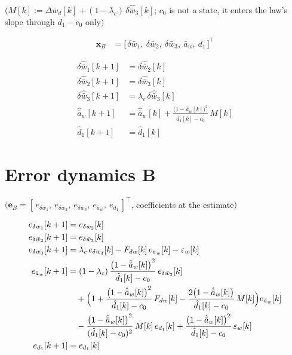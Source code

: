 \documentclass[11pt,a4paper,fontset=none]{ctexart}
\newcommand{\ba}{\bar{a}}
\newcommand{\bw}{\bar{w}}
\newcommand{\ah}{\hat{\ba}_w}
\newcommand{\dhat}{\hat{d}_1}
\begin{document}
$\bigl(M[k] := \Delta\bw_d[k] + (1-\lambda_c)\,\delta\hat{\bw}_3[k]$; $c_0$ is not a state, it enters the law's slope through $d_1 - c_0$ only$\bigr)$

\begin{align*}
\mathbf{x}_B &= \bigl[\,\delta\bw_1,\ \delta\bw_2,\ \delta\bw_3,\ \ba_w,\ d_1\,\bigr]^{\top}
\end{align*}

\begin{align*}
\delta\hat{\bw}_1[k+1] &= \delta\hat{\bw}_2[k] \\
\delta\hat{\bw}_2[k+1] &= \delta\hat{\bw}_3[k] \\
\delta\hat{\bw}_3[k+1] &= \lambda_c\,\delta\hat{\bw}_3[k] \\
\ah[k+1]               &= \ah[k] + \frac{\bigl(1-\ah[k]\bigr)^{2}}{\dhat[k] - c_0}\,M[k] \\
\dhat[k+1]               &= \dhat[k]
\end{align*}

\section{Error dynamics B}

$\bigl(\mathbf{e}_B = [\,e_{\delta\bw_1},\ e_{\delta\bw_2},\ e_{\delta\bw_3},\ e_{\ba_w},\ e_{d_1}\,]^{\top}$, coefficients at the estimate$\bigr)$

\begin{align*}
e_{\delta\bw_1}[k+1] &= e_{\delta\bw_2}[k] \\
e_{\delta\bw_2}[k+1] &= e_{\delta\bw_3}[k] \\
e_{\delta\bw_3}[k+1] &= \lambda_c\,e_{\delta\bw_3}[k] - F_{dw}[k]\,e_{\ba_w}[k] - \varepsilon_w[k] \\
e_{\ba_w}[k+1]       &= (1-\lambda_c)\,\frac{\bigl(1-\ah[k]\bigr)^{2}}{\dhat[k] - c_0}\,e_{\delta\bw_3}[k] \\
                     &\quad + \Bigl(1 + \frac{\bigl(1-\ah[k]\bigr)^{2}}{\dhat[k] - c_0}\,F_{dw}[k] - \frac{2\bigl(1-\ah[k]\bigr)}{\dhat[k] - c_0}\,M[k]\Bigr)e_{\ba_w}[k] \\
                     &\quad - \frac{\bigl(1-\ah[k]\bigr)^{2}}{(\dhat[k] - c_0)^{2}}\,M[k]\,e_{d_1}[k]
                        + \frac{\bigl(1-\ah[k]\bigr)^{2}}{\dhat[k] - c_0}\,\varepsilon_w[k] \\
e_{d_1}[k+1]         &= e_{d_1}[k]
\end{align*}
\end{document}
